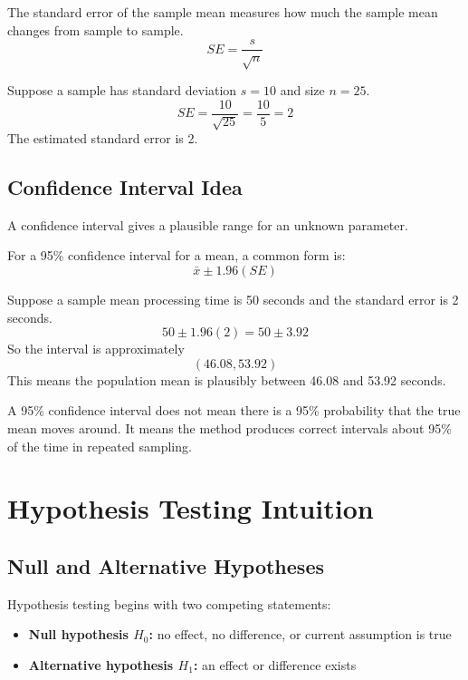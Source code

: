 \documentclass[11pt,a4paper]{article}
\begin{document}
The standard error of the sample mean measures how much the sample mean changes from sample to sample.
\[
SE = \frac{s}{\sqrt{n}}
\]

\begin{examplebox}
Suppose a sample has standard deviation $s = 10$ and size $n = 25$.
\[
SE = \frac{10}{\sqrt{25}} = \frac{10}{5} = 2
\]
The estimated standard error is 2.
\end{examplebox}

\subsection{Confidence Interval Idea}

A confidence interval gives a plausible range for an unknown parameter.

For a 95\% confidence interval for a mean, a common form is:
\[
\bar{x} \pm 1.96(SE)
\]

\begin{examplebox}
Suppose a sample mean processing time is 50 seconds and the standard error is 2 seconds.
\[
50 \pm 1.96(2) = 50 \pm 3.92
\]
So the interval is approximately
\[
(46.08, 53.92)
\]
This means the population mean is plausibly between 46.08 and 53.92 seconds.
\end{examplebox}

\begin{alertbox}
A 95\% confidence interval does not mean there is a 95\% probability that the true mean moves around. It means the method produces correct intervals about 95\% of the time in repeated sampling.
\end{alertbox}

\section{Hypothesis Testing Intuition}

\subsection{Null and Alternative Hypotheses}

Hypothesis testing begins with two competing statements:

\begin{itemize}[leftmargin=*]
  \item \textbf{Null hypothesis $H_0$:} no effect, no difference, or current assumption is true
  \item \textbf{Alternative hypothesis $H_1$:} an effect or difference exists
\end{itemize}
\end{document}
